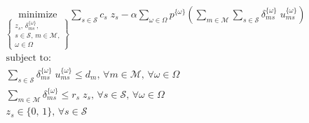 \documentclass[onecolumn,draftcls]{IEEEtran}
\begin{document}
\vspace{5mm}
\begin{tcolorbox}[title = Problem 2 (Deterministic Equivalent Program of Problem 1)]
\begin{align}
& 
\underset{\left\{ \substack{
	z_s,\, \delta_{ms}^{\{\omega\}},\\
	s \in \mathcal{S},\, m \in \mathcal{M},\\
	\omega \in \Omega} \right\}} {\text{minimize}}
\sum_{s \in \mathcal{S}} c_s \; z_s - \alpha \sum_{\omega \in \Omega} p^{\{\omega\}} \left( \sum_{m \in \mathcal{M}} \sum_{s \in \mathcal{S}} \delta_{ms}^{\{\omega\}} \; u_{ms}^{\{\omega\}} \right) \label{eq:P2}\\
& \text{subject to:}  \nonumber \\
& \sum_{s \in \mathcal{S}} \delta_{ms}^{\{\omega\}} \; u_{ms}^{\{\omega\}} \leq d_m,\, \forall m \in \mathcal{M},\, \forall \omega \in \Omega \label{eq:P2C1}\\
& \sum_{m \in \mathcal{M}} \delta_{ms}^{\{\omega\}} \leq r_s \; z_s,\, \forall s \in \mathcal{S},\, \forall \omega \in \Omega \label{eq:P2C2}\\
& z_s \in \{0,\, 1\},\, \forall s \in \mathcal{S} \label{eq:P2C3}
\end{align}
\end{tcolorbox}

\iffalse
\vspace{5mm}
\noindent \textbf{Problem 2 (DEP of Problem 1)}



\begin{equation} \label{eq:P2}
\underset{\left\{ \substack{
	z_s,\, \delta_{ms}^{\{\omega\}},\\
	s \in \mathcal{S},\, m \in \mathcal{M},\\
	\omega \in \Omega} \right\}} {\text{minimize}}
\sum_{s \in \mathcal{S}} c_s z_s - \alpha \sum_{\omega \in \Omega} p^{\{\omega\}} \left( \sum_{m \in \mathcal{M}} \sum_{s \in \mathcal{S}} \delta_{ms}^{\{\omega\}} u_{ms}^{\{\omega\}} \right)
\end{equation}
subject to:
\begin{equation} \label{eq:P2C1}
\sum_{s \in \mathcal{S}} u_{ms}^{\{\omega\}} \delta_{ms}^{\{\omega\}} \leq d_m,\, \forall m \in \mathcal{M},\, \forall \omega \in \Omega
\end{equation}
\begin{equation} \label{eq:P2C2}
\sum_{m \in \mathcal{M}} \delta_{ms}^{\{\omega\}} \leq r_s z_s,\, \forall s \in \mathcal{S},\, \forall \omega \in \Omega
\end{equation}
\begin{equation} \label{eq:P2C3}
z_s \in \{0,\, 1\},\, \forall s \in \mathcal{S}
\end{equation}
\fi
\end{document}
